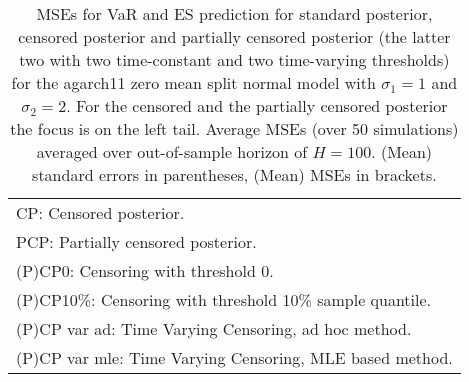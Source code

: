 {\begin{sidewaystable}
\begin{tabular}{cc cc cccc cccc}
\multicolumn{12}{l}{\footnotesize{CP: Censored posterior.}}  \\ 
\multicolumn{12}{l}{\footnotesize{PCP: Partially censored posterior.}} \\ 
\multicolumn{12}{l}{\footnotesize{(P)CP0: Censoring with threshold 0.}} \\ 
\multicolumn{12}{l}{\footnotesize{(P)CP10\%: Censoring with threshold 10\% sample quantile.}}  \\ 
\multicolumn{12}{l}{\footnotesize{(P)CP var ad: Time Varying Censoring, ad hoc method.}} \\ 
\multicolumn{12}{l}{\footnotesize{(P)CP var mle: Time Varying Censoring, MLE based method.}}  \\ 
\end{tabular}
 \caption{MSEs for VaR and ES prediction for standard posterior, censored posterior and partially censored posterior (the latter two with two time-constant and two time-varying thresholds) for the agarch11 zero mean split normal model with $\sigma_{1} = 1$ and $\sigma_{2} = 2$. For the censored and the partially censored posterior the focus is on the left tail. Average MSEs (over 50 simulations) averaged over out-of-sample horizon of $H=100$. (Mean) standard errors in parentheses, (Mean) MSEs in brackets.} 
\label{tab:agarch11_pcp_var}  
\end{sidewaystable}
}